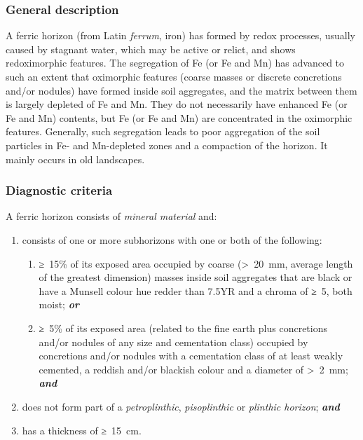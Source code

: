 \documentclass[
  letterpaper,
  DIV=11,
  numbers=noendperiod]{scrreprt}
\providecommand{\tightlist}{%
  \setlength{\itemsep}{0pt}\setlength{\parskip}{0pt}}\usepackage{longtable,booktabs,array}
\begin{document}
\hypertarget{general-description-10}{%
\subsubsection{General description}\label{general-description-10}}

A ferric horizon (from Latin \emph{ferrum}, iron) has formed by redox
processes, usually caused by stagnant water, which may be active or
relict, and shows redoximorphic features. The segregation of Fe (or Fe
and Mn) has advanced to such an extent that oximorphic features (coarse
masses or discrete concretions and/or nodules) have formed inside soil
aggregates, and the matrix between them is largely depleted of Fe and
Mn. They do not necessarily have enhanced Fe (or Fe and Mn) contents,
but Fe (or Fe and Mn) are concentrated in the oximorphic features.
Generally, such segregation leads to poor aggregation of the soil
particles in Fe- and Mn-depleted zones and a compaction of the horizon.
It mainly occurs in old landscapes.

\hypertarget{diagnostic-criteria-10}{%
\subsubsection{Diagnostic criteria}\label{diagnostic-criteria-10}}

A ferric horizon consists of \emph{mineral material} and:

\begin{enumerate}
\def\labelenumi{\arabic{enumi}.}
\item
  consists of one or more subhorizons with one or both of the following:

  \begin{enumerate}
  \def\labelenumii{\alph{enumii}.}
  \tightlist
  \item
    ≥~15\% of its exposed area occupied by coarse (\textgreater~20~mm,
    average length of the greatest dimension) masses inside soil
    aggregates that are black or have a Munsell colour hue redder than
    7.5YR and a chroma of ≥~5, both moist; \textbf{\emph{or}}
  \item
    ≥~5\% of its exposed area (related to the fine earth plus
    concretions and/or nodules of any size and cementation class)
    occupied by concretions and/or nodules with a cementation class of
    at least weakly cemented, a reddish and/or blackish colour and a
    diameter of \textgreater~2~mm; \textbf{\emph{and}}
  \end{enumerate}
\item
  does not form part of a \emph{petroplinthic}, \emph{pisoplinthic} or
  \emph{plinthic horizon}; \textbf{\emph{and}}
\item
  has a thickness of ≥~15~cm.
\end{enumerate}
\end{document}
